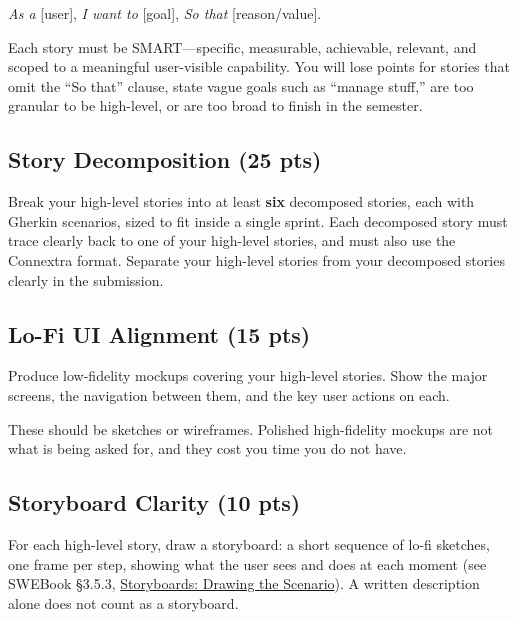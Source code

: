 \documentclass[11pt]{article}
\begin{document}
\begin{center}
\textit{As a} [user], \textit{I want to} [goal], \textit{So that} [reason/value].
\end{center}

Each story must be SMART---specific, measurable, achievable, relevant, and scoped to a meaningful user-visible capability. You will lose points for stories that omit the ``So that'' clause, state vague goals such as ``manage stuff,'' are too granular to be high-level, or are too broad to finish in the semester.

\subsection{Story Decomposition (25 pts)}
Break your high-level stories into at least \textbf{six} decomposed stories, each with Gherkin scenarios, sized to fit inside a single sprint. Each decomposed story must trace clearly back to one of your high-level stories, and must also use the Connextra format. Separate your high-level stories from your decomposed stories clearly in the submission.

\subsection{Lo-Fi UI Alignment (15 pts)}
Produce low-fidelity mockups covering your high-level stories. Show the major screens, the navigation between them, and the key user actions on each.

These should be sketches or wireframes. Polished high-fidelity mockups are not what is being asked for, and they cost you time you do not have.

\subsection{Storyboard Clarity (10 pts)}
For each high-level story, draw a storyboard: a short sequence of lo-fi sketches, one frame per step, showing what the user sees and does at each moment (see SWEBook \S3.5.3, \href{https://www.swebook.org/chapters/03-user-requirements/index.html#353-storyboards-drawing-the-scenario}{Storyboards: Drawing the Scenario}). A written description alone does not count as a storyboard.
\end{document}

